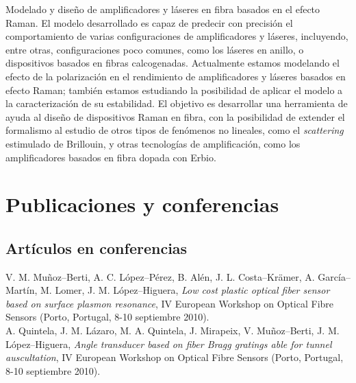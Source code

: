 \documentclass[11pt, a4paper]{article}
\newcommand{\years}[1]{\marginnote{\scriptsize #1}}
\begin{document}
\years{2010-presente}Modelado y diseño de amplificadores y láseres en fibra basados en el efecto Raman. El modelo desarrollado es capaz de predecir con precisión el comportamiento de varias configuraciones de amplificadores y láseres, incluyendo, entre otras, configuraciones poco comunes, como los láseres en anillo, o dispositivos basados en fibras calcogenadas. Actualmente estamos modelando el efecto de la polarización en el rendimiento de amplificadores y láseres basados en efecto Raman; también estamos estudiando la posibilidad de aplicar el modelo a la caracterización de su estabilidad. El objetivo es desarrollar una herramienta de ayuda al diseño de dispositivos Raman en fibra, con la posibilidad de extender el formalismo al estudio de otros tipos de fenómenos no lineales, como el \emph{scattering} estimulado de Brillouin, y otras tecnologías de amplificación, como los amplificadores basados en fibra dopada con Erbio.\\


\section*{Publicaciones y conferencias} %

\subsection*{Artículos en conferencias}
\noindent
\years{2010}V. M. Muñoz--Berti, A. C. López--Pérez, B. Alén, J. L. Costa--Krämer, A. García--Martín, M. Lomer, J. M. López--Higuera, \textit{Low cost plastic optical fiber sensor based on surface plasmon resonance}, IV European Workshop on Optical Fibre Sensors (Porto, Portugal, 8-10 septiembre 2010).\\
\years{2010}A. Quintela, J. M. Lázaro, M. A. Quintela, J. Mirapeix, V. Muñoz--Berti, J. M. López--Hi\-gue\-ra, \textit{Angle transducer based on fiber Bragg gratings able for tunnel auscultation}, IV European Workshop on Optical Fibre Sensors (Porto, Portugal, 8-10 septiembre 2010).
\end{document}
